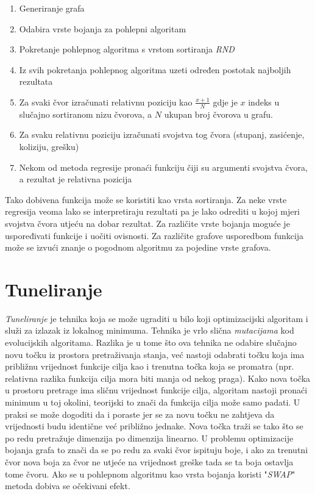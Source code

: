 \documentclass[times, utf8, diplomski, numeric]{fer}
\begin{document}
\begin{enumerate}
	\item Generiranje grafa
	\item Odabira vrste bojanja za pohlepni algoritam
	\item Pokretanje pohlepnog algoritma s vrstom sortiranja \emph{RND}
	\item Iz svih pokretanja pohlepnog algoritma uzeti određen postotak najboljih rezultata
	\item Za svaki čvor izračunati relativnu poziciju kao $\frac{x+1}{N}$ gdje je $x$ indeks u slučajno sortiranom nizu čvorova, a $N$ ukupan broj čvorova u grafu. 
	\item Za svaku relativnu poziciju izračunati svojstva tog čvora (stupanj, zasićenje, koliziju, grešku)
	\item Nekom od metoda regresije pronaći funkciju čiji su argumenti svojstva čvora, a rezultat je relativna pozicija
\end{enumerate}

Tako dobivena funkcija može se koristiti kao vrsta sortiranja. Za neke vrste regresija veoma lako se interpretiraju rezultati pa je lako odrediti u kojoj mjeri svojstva čvora utjeću na dobar rezultat. Za različite vrste bojanja moguće je uspoređivati funkcije i uočiti ovisnosti. Za različite grafove usporedbom funkcija može se izvući znanje o pogodnom algoritmu za pojedine vrste grafova. 

\section{Tuneliranje}

\emph{Tuneliranje} je tehnika koja se može ugraditi u bilo koji optimizacijski algoritam i služi za izlazak iz lokalnog minimuma. Tehnika je vrlo slična \emph{mutacijama} kod evolucijskih algoritama. Razlika je u tome što ova tehnika ne odabire slučajno novu točku iz prostora pretraživanja stanja, već nastoji odabrati točku koja ima približnu vrijednost funkcije cilja kao i trenutna točka koja se promatra (npr. relativna razlika funkcija cilja mora biti manja od nekog praga). Kako nova točka u prostoru pretrage ima sličnu vrijednost funkcije cilja, algoritam nastoji pronaći minimum u toj okolini, teorijski to znači da funkcija cilja može samo padati. U praksi se može dogoditi da i poraste jer se za novu točku ne zahtjeva da vrijednosti budu identične već približno jednake. Nova točka traži se tako što se po redu pretražuje dimenzija po dimenzija linearno. U problemu optimizacije bojanja grafa to znači da se po redu za svaki čvor ispituju boje, i ako za trenutni čvor nova boja za čvor ne utjeće na vrijednost greške tada se ta boja ostavlja tome čvoru. Ako se u pohlepnom algoritmu kao vrsta bojanja koristi "\emph{SWAP}" metoda dobiva se očekivani efekt. 
\end{document}
